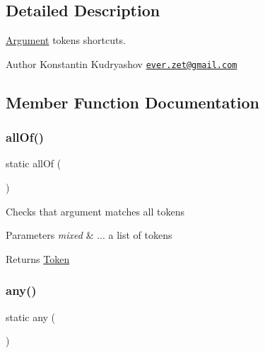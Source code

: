 \subsection{Detailed Description}
\mbox{\hyperlink{class_prophecy_1_1_argument}{Argument}} tokens shortcuts.

\begin{DoxyAuthor}{Author}
Konstantin Kudryashov \href{mailto:ever.zet@gmail.com}{\tt ever.\+zet@gmail.\+com} 
\end{DoxyAuthor}


\subsection{Member Function Documentation}
\mbox{\label{class_prophecy_1_1_argument_aff73b09379cb974e50f38eb63fb516d4}} 
\subsubsection{\texorpdfstring{all\+Of()}{allOf()}}
{\footnotesize\ttfamily static all\+Of (\begin{DoxyParamCaption}{ }\end{DoxyParamCaption})\hspace{0.3cm}{\ttfamily [static]}}

Checks that argument matches all tokens


\begin{DoxyParams}{Parameters}
{\em mixed} & ... a list of tokens\\
\hline
\end{DoxyParams}
\begin{DoxyReturn}{Returns}
\mbox{\hyperlink{namespace_prophecy_1_1_argument_1_1_token}{Token}} 
\end{DoxyReturn}
\mbox{\label{class_prophecy_1_1_argument_a8347b85f5dc642279e508472941836f2}} 
\subsubsection{\texorpdfstring{any()}{any()}}
{\footnotesize\ttfamily static any (\begin{DoxyParamCaption}{ }\end{DoxyParamCaption})\hspace{0.3cm}{\ttfamily [static]}}

